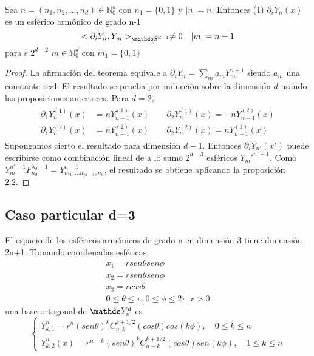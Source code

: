 \begin{thm}
	Sea $n=(n_1,n_2,...,n_d)\in\mathds{N}_0^d$ con $n_1=\{0,1\}$ y $|n|=n$. Entonces
	(1) $\partial_i Y_n(x)$ es un esférico armónico de grado n-1 $$
	<\partial_i Y_n,Y_m>_{\sphere} \neq 0 \quad |m|=n-1$$
	para s $2^{d-2}$ $m\in\mathds{N}_0^d$ con $m_1=\{0,1\}$
\end{thm}
\begin{proof}
La afirmación del teorema equivale a $\partial_i Y_n = \sum_{m} a_mY_m^{n-1}$ siendo $a_m$ una constante real. El resultado se prueba por inducción sobre la dimensión $d$ usando las proposiciones anteriores.
Para $d=2$, 
\begin{gather*}
\begin{aligned}
\partial_1 Y_n^{(1)}(x) &= nY_{n-1}^{(1)}(x) \qquad \partial_2 Y_n^{(1)}(x) = -nY_{n-1}^{(2)}(x)
\\ \partial_1 Y_n^{(2)}(x) &= nY_{n-1}^{(2)}(x) \qquad \partial_2 Y_n^{(2)}(x) = nY_{n-1}^{(1)}(x)
\end{aligned}
\end{gather*}
Supongamos cierto el resultado para dimensión $d-1$. Entonces $\partial_i Y_{n'}(x')$ puede escribirse como combinación lineal de a lo sumo $2^{d-3}$ esféricos $Y_m'^{n'-1}$. Como $Y_m^{n'-1}F_{n_d}^{\lambda_d-1} = Y_{m_1,...m_{d-1},n_d}^{n-1}$, el resultado se obtiene aplicando la proposición 2.2.
\end{proof}
\subsection{Caso particular d=3}
El espacio de los esféricos armónicos de grado n en dimensión 3 tiene dimensión 2n+1. Tomando coordenadas esféricas,
\begin{gather*}
x_1 = r sen \theta sen \phi\\
x_2 = r sen \theta sen \phi\\
x_3 = r cos \theta\\
0\le \theta \le \pi,0\le\phi\le2\pi,r>0
\end{gather*}
una base ortogonal de $\spharm$ es
\begin{equation}
	\left\lbrace
	\begin{array}{ll}
	Y^n_ {k,1} = r^n(sen \theta)^kC_{n,k}^{k+1/2}(cos \theta) cos(k\phi),\quad 0\le k\le n \\
	Y^n_{k,2}(x) = r^{n-k}(sen\theta)^kC^{k+1/2}_{n-k}(cos\theta)sen(k\phi), \quad 1\le k\le n
	\end{array}
	\right.
\end{equation}

